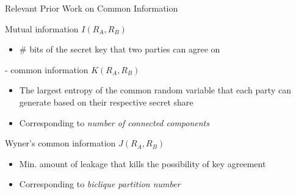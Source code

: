 \begin{frame}{Relevant Prior Work on Common Information}

	{
	\begin{block}{Mutual information $ I(R_A, R_B) $}
		\begin{itemize}
			\item $ \# $ bits of the secret key that two parties can agree on
		\end{itemize}
	\end{block}}
	\pause
	{
	\begin{block}{\gacs-\korner \cite{} common information  $ K(R_A, R_B) $}
		\begin{itemize}
			\item The largest entropy of the common random variable that each party can generate based on their respective secret share
			\item Corresponding to \textit{number of connected components}
		\end{itemize}
	\end{block}}
	\pause
	{
	\begin{block}{Wyner's common information \cite{} $ J(R_A, R_B) $}
		\begin{itemize}
			\item Min. amount of leakage that kills the possibility of key agreement
			\item Corresponding to \textit{biclique partition number}
		\end{itemize}
	\end{block}}
\end{frame}


